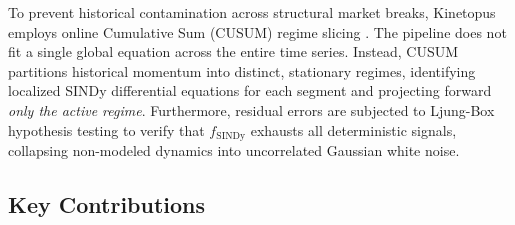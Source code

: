 \documentclass[11pt,a4paper]{article}
\begin{document}
To prevent historical contamination across structural market breaks, Kinetopus employs online Cumulative Sum (CUSUM) regime slicing \cite{page1954continuous, basseville1993detection}. The pipeline does not fit a single global equation across the entire time series. Instead, CUSUM partitions historical momentum into distinct, stationary regimes, identifying localized SINDy differential equations for each segment and projecting forward \textit{only the active regime}. Furthermore, residual errors are subjected to Ljung-Box hypothesis testing \cite{ljung1978measure} to verify that $f_{\text{SINDy}}$ exhausts all deterministic signals, collapsing non-modeled dynamics into uncorrelated Gaussian white noise.

\subsection{Key Contributions}
\end{document}
